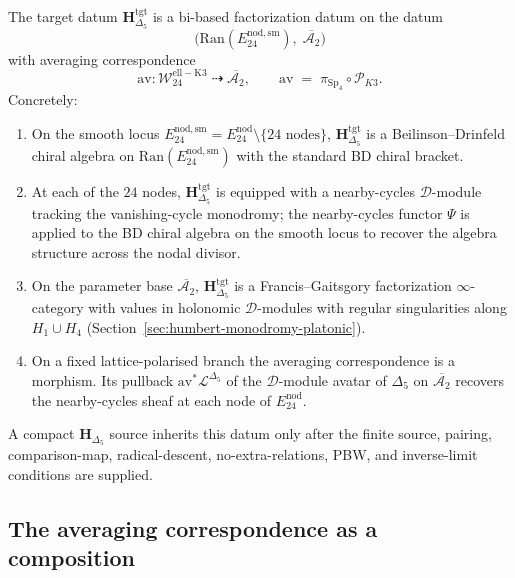 \begin{theorem}
\label{thm:k3-bi-based-factorization}
The target datum $\mathbf{H}_{\Delta_5}^{\mathrm{tgt}}$ is a bi-based factorization datum on
the datum
\[
 \bigl(\mathrm{Ran}(E^{\mathrm{nod,sm}}_{24}),\; \overline{\mathcal{A}_2}\bigr)
\]
with averaging correspondence
\[
 \mathrm{av}\colon \mathcal{W}^{\mathrm{ell-K3}}_{24} \;\dashrightarrow\; \overline{\mathcal{A}_2},
 \qquad
 \mathrm{av}
 \;=\;
 \pi_{\mathrm{Sp}_4}\circ \mathscr{P}_{K3}.
\]
Concretely:
\begin{enumerate}[label=\textup{(\roman*)}]
\item On the smooth locus $E^{\mathrm{nod,sm}}_{24} = E^{\mathrm{nod}}_{24}\setminus\{24\text{ nodes}\}$,
 $\mathbf{H}_{\Delta_5}^{\mathrm{tgt}}$ is a Beilinson--Drinfeld chiral algebra on
 $\mathrm{Ran}(E^{\mathrm{nod,sm}}_{24})$ with the standard BD chiral bracket.
\item At each of the $24$ nodes, $\mathbf{H}_{\Delta_5}^{\mathrm{tgt}}$ is equipped with a
 nearby-cycles $\mathcal{D}$-module tracking the vanishing-cycle monodromy; the
 nearby-cycles functor $\Psi$ is applied to the BD chiral algebra on the smooth
 locus to recover the algebra structure across the nodal divisor.
\item On the parameter base $\overline{\mathcal{A}_2}$, $\mathbf{H}_{\Delta_5}^{\mathrm{tgt}}$ is a
 Francis--Gaitsgory factorization $\infty$-category with values in holonomic
 $\mathcal{D}$-modules with regular singularities along $H_1\cup H_4$
 (Section~\ref{sec:humbert-monodromy-platonic}).
\item On a fixed lattice-polarised branch the averaging correspondence is a morphism. Its pullback $\mathrm{av}^* \mathcal{L}^{\Delta_5}$ of the $\mathcal{D}$-module avatar of $\Delta_5$ on $\overline{\mathcal{A}_2}$ recovers the nearby-cycles sheaf at each node of $E^{\mathrm{nod}}_{24}$.
\end{enumerate}
A compact $\mathbf{H}_{\Delta_5}$ source inherits this datum only after the
finite source, pairing, comparison-map, radical-descent, no-extra-relations,
PBW, and inverse-limit conditions are supplied.
\end{theorem}

\subsection{The averaging correspondence as a composition}
\label{subsec:averaging-morphism-unpacked-k3}

